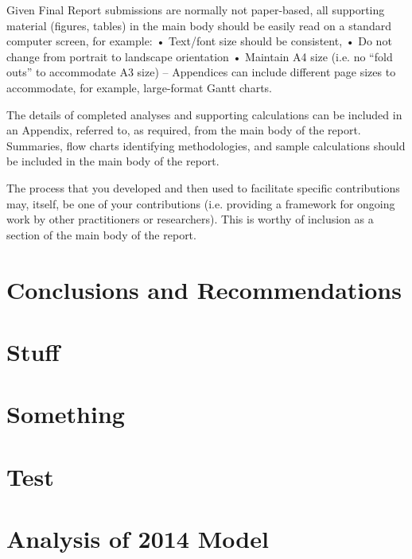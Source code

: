 \documentclass[]{article}
\begin{document}
Given Final Report submissions are normally not paper-based, all supporting material (figures, tables) in the main body should be easily read on a standard computer screen, for example:
•	Text/font size should be consistent, 
•	Do not change from portrait to landscape orientation 
•	Maintain A4 size (i.e. no “fold outs” to accommodate A3 size) – Appendices can include different page sizes to accommodate, for example, large-format Gantt charts.

The details of completed analyses and supporting calculations can be included in an Appendix, referred to, as required, from the main body of the report.  Summaries, flow charts identifying methodologies, and sample calculations should be included in the main body of the report.

The process that you developed and then used to facilitate specific contributions may, itself, be one of your contributions (i.e. providing a framework for ongoing work by other practitioners or researchers).  This is worthy of inclusion as a section of the main body of the report.
\color{black} 

\section{Conclusions and Recommendations}


\newpage



\appendix

\newpage

\section{Stuff}


\newpage
\section{Something}


\section{Test}


\section{Analysis of 2014 Model}
	
\end{document}
